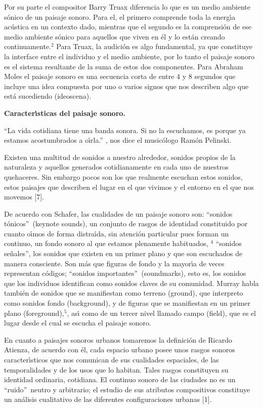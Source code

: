 Por su parte el compositor Barry Truax diferencia lo que es un medio ambiente
s\'{o}nico de un paisaje sonoro. Para el, el primero comprende toda la
energ\'{\i}a ac\'{u}stica en un contexto dado, mientras que el segundo es la
comprensi\'{o}n de ese medio ambiente s\'{o}nico para aquellos que viven en
\'{e}l y lo est\'{a}n creando continuamente.$^{2}$ Para Truax, la audici\'{o}n
es algo fundamental, ya que constituye la interface entre el individuo y el
medio ambiente, por lo tanto el paisaje sonoro es el sistema resultante de la
suma de estos dos componentes. Para Abraham Moles el paisaje sonoro es una
secuencia corta de entre 4 y 8 segundos que incluye una idea compuesta por uno
o varios signos que nos describen algo que est\'{a} sucediendo (ideoscena).

\textbf{ Caracter\'{\i}sticas del paisaje sonoro.}

\textquotedblleft La vida cotidiana tiene una banda sonora. Si no la
escuchamos, es porque ya estamos acostumbrados a o\'{\i}rla.\textquotedblright%
, nos dice el music\'{o}logo Ram\'{o}n Pelinski.

Existen una multitud de sonidos a nuestro alrededor, sonidos propios de la
naturaleza y aquellos generados cotidianamente en cada uno de nuestros
quehaceres. Sin embargo pocos son los que realmente escuchan estos sonidos,
estos paisajes que describen el lugar en el que vivimos y el entorno en el que
nos movemos [7].

De acuerdo con Schafer, las cualidades de un paisaje sonoro son:
\textquotedblleft sonidos t\'{o}nicos\textquotedblright\ (keynote sounds), un
conjunto de rasgos de identidad constituido por cuanto o\'{\i}mos de forma
distra\'{\i}da, sin atenci\'{o}n particular pues forman un continuo, un fondo
sonoro al que estamos plenamente habituados, $^{4}$ \textquotedblleft sonidos
se\~{n}ales\textquotedblright, los sonidos que existen en un primer plano y
que son escuchados de manera consciente. Son m\'{a}s que figuras de fondo y la
mayor\'{\i}a de veces representan c\'{o}digos; \textquotedblleft sonidos
importantes\textquotedblright\ (soundmarks), esto es, los sonidos que los
individuos identifican como sonidos claves de su comunidad. Murray habla
tambi\'{e}n de sonidos que se manifiestan como terreno (ground), que
interpreto como sonidos fondo (background), y de figuras que se manifiestan en
un primer plano (foreground),$^{5}$, as\'{\i} como de un tercer nivel llamado
campo (field), que es el lugar desde el cual se escucha el paisaje sonoro.

En cuanto a paisajes sonoros urbanos tomaremos la definici\'{o}n de Ricardo
Atienza, de acuerdo con \'{e}l, cada espacio urbano posee unos rasgos sonoros
caracter\'{\i}sticos que nos comunican de sus cualidades espaciales, de las
temporalidades y de los usos que lo habitan. Tales rasgos constituyen su
identidad ordinaria, cotidiana. El continuo sonoro de las ciudades no es un
\textquotedblleft ruido\textquotedblright\ neutro y arbitrario; el estudio de
sus atributos compositivos constituye un an\'{a}lisis cualitativo de las
diferentes configuraciones urbanas [1].

